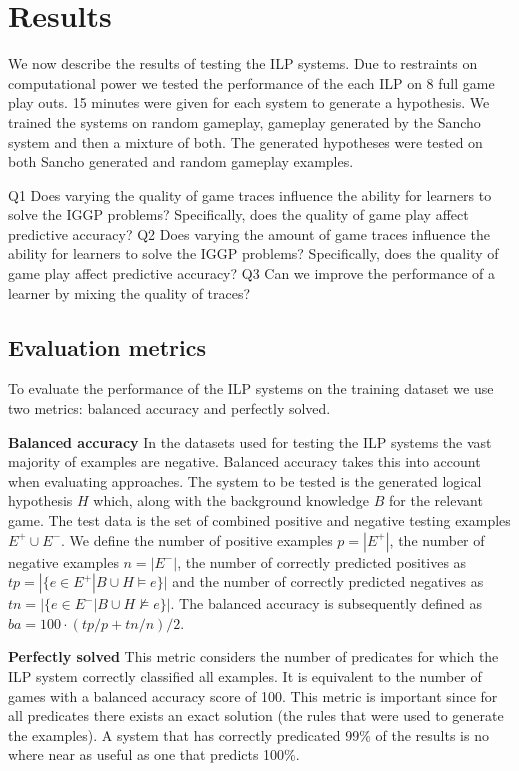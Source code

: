 \chapter{Results}\label{sec:results}
We now describe the results of testing the ILP systems. Due to restraints on computational power we tested the performance of the each ILP on 8 full game play outs. 15 minutes were given for each system to generate a hypothesis. We trained the systems on random gameplay, gameplay generated by the Sancho system and then a mixture of both. The generated hypotheses were tested on both Sancho generated and random gameplay examples.



Q1 Does varying the quality of game traces influence the ability for learners to solve the IGGP problems? Specifically, does the quality of game play affect predictive accuracy?
Q2 Does varying the amount of game traces influence the ability for learners to solve the IGGP problems? Specifically, does the quality of game play affect predictive accuracy?
Q3 Can we improve the performance of a learner by mixing the quality of traces?

\section{Evaluation metrics}
To evaluate the performance of the ILP systems on the training dataset we use two metrics: balanced accuracy and perfectly solved.

\textbf{Balanced accuracy} In the datasets used for testing the ILP systems the vast majority of examples are negative. Balanced accuracy takes this into account when evaluating approaches. The system to be tested is the generated logical hypothesis $H$ which, along with the background knowledge $B$ for the relevant game. The test data is the set of combined positive and negative testing examples $E^+ \cup E^-$. We define the number of positive examples $p = |E^+|$, the number of negative examples $n = |E^-|$, the number of correctly predicted positives as $tp = |\{e\in E^+|B\cup H \models e\}|$ and the number of correctly predicted negatives as $tn = |\{e\in E^-|B\cup H \not\models e\}|$. The balanced accuracy is subsequently defined as $ba = 100 \cdot (tp/p + tn/n)/2$.

\textbf{Perfectly solved} This metric considers the number of predicates for which the ILP system correctly classified all examples. It is equivalent to the number of games with a balanced accuracy score of 100. This metric is important since for all predicates there exists an exact solution (the rules that were used to generate the examples). A system that has correctly predicated 99\% of the results is no where near as useful as one that predicts 100\%.

